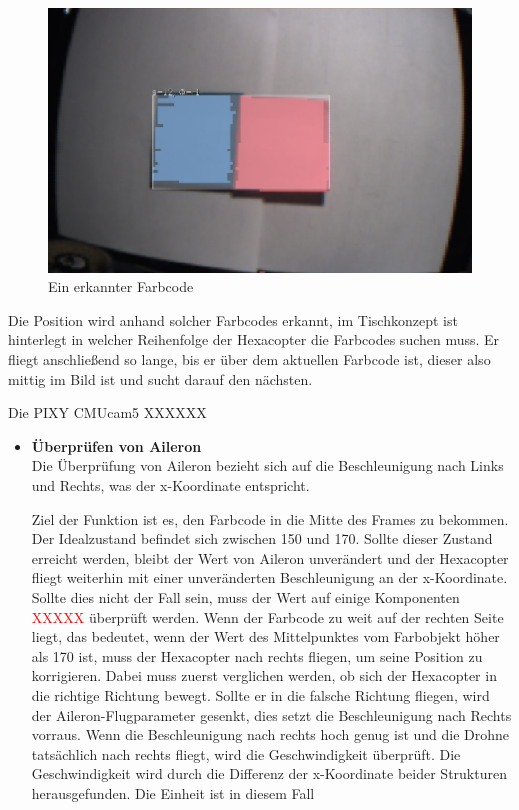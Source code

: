 \begin{itemize}
    \begin{figure} [tbh]
      \begin{centering}
        \includegraphics[width = \textwidth]{Bilder/Farbcode_erkannt}
      \par\end{centering}
      \caption{Ein erkannter Farbcode}
      \label{Farbcode_erkannt}
    \end{figure}
    Die Position wird anhand solcher Farbcodes erkannt, im Tischkonzept ist hinterlegt in welcher Reihenfolge der Hexacopter die Farbcodes suchen muss.
    Er fliegt anschließend so lange, bis er über dem aktuellen Farbcode ist, dieser also mittig im Bild ist und sucht darauf den nächsten.


    Die PIXY CMUcam5 XXXXXX %



      \begin{itemize}
        \item \textbf{Überprüfen von Aileron}\\
        Die Überprüfung von Aileron bezieht sich auf die Beschleunigung nach Links und Rechts, was der x-Koordinate entspricht.

        Ziel der Funktion ist es, den Farbcode in die Mitte des Frames zu bekommen. Der Idealzustand befindet sich zwischen 150 und 170.
        Sollte dieser Zustand erreicht werden, bleibt der Wert von Aileron unverändert und der Hexacopter fliegt weiterhin mit einer unveränderten Beschleunigung an der
        x-Koordinate.
        Sollte dies nicht der Fall sein, muss der Wert auf einige Komponenten \textcolor{red}{XXXXX} überprüft werden.
        Wenn der Farbcode zu weit auf der rechten Seite liegt, das bedeutet, wenn der Wert des Mittelpunktes vom Farbobjekt höher als 170 ist,
        muss der Hexacopter nach rechts fliegen, um seine Position zu korrigieren.
        Dabei muss zuerst verglichen werden, ob sich der Hexacopter in die richtige Richtung bewegt. Sollte er in die falsche Richtung
        fliegen, wird der Aileron-Flugparameter gesenkt, dies setzt die Beschleunigung nach Rechts vorraus.
        Wenn die Beschleunigung nach rechts hoch genug ist und die Drohne tatsächlich nach rechts fliegt, wird die Geschwindigkeit überprüft.
        Die Geschwindigkeit wird durch die Differenz der x-Koordinate beider Strukturen herausgefunden. Die Einheit ist in diesem Fall


\end{itemize}
\end{itemize}
